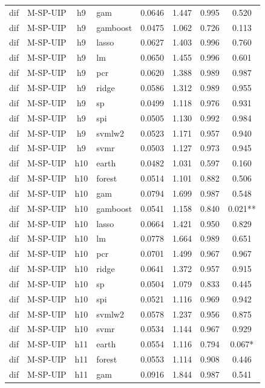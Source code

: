 \begin{ThreePartTable}
\begin{longtable}[t]{llclcccc}
dif & M-SP-UIP & h9 & gam & 0.0646 & 1.447 & 0.995 & 0.520\\
dif & M-SP-UIP & h9 & gamboost & 0.0475 & 1.062 & 0.726 & 0.113\\
dif & M-SP-UIP & h9 & lasso & 0.0627 & 1.403 & 0.996 & 0.760\\
dif & M-SP-UIP & h9 & lm & 0.0650 & 1.455 & 0.996 & 0.601\\
dif & M-SP-UIP & h9 & pcr & 0.0620 & 1.388 & 0.989 & 0.987\\
dif & M-SP-UIP & h9 & ridge & 0.0586 & 1.312 & 0.989 & 0.955\\
dif & M-SP-UIP & h9 & sp & 0.0499 & 1.118 & 0.976 & 0.931\\
dif & M-SP-UIP & h9 & spi & 0.0505 & 1.130 & 0.992 & 0.984\\
dif & M-SP-UIP & h9 & svmlw2 & 0.0523 & 1.171 & 0.957 & 0.940\\
dif & M-SP-UIP & h9 & svmr & 0.0503 & 1.127 & 0.973 & 0.945\\
\addlinespace
dif & M-SP-UIP & h10 & earth & 0.0482 & 1.031 & 0.597 & 0.160\\
dif & M-SP-UIP & h10 & forest & 0.0514 & 1.101 & 0.882 & 0.506\\
dif & M-SP-UIP & h10 & gam & 0.0794 & 1.699 & 0.987 & 0.548\\
dif & M-SP-UIP & h10 & gamboost & 0.0541 & 1.158 & 0.840 & 0.021**\\
dif & M-SP-UIP & h10 & lasso & 0.0664 & 1.421 & 0.950 & 0.829\\
dif & M-SP-UIP & h10 & lm & 0.0778 & 1.664 & 0.989 & 0.651\\
dif & M-SP-UIP & h10 & pcr & 0.0701 & 1.499 & 0.967 & 0.967\\
dif & M-SP-UIP & h10 & ridge & 0.0641 & 1.372 & 0.957 & 0.915\\
dif & M-SP-UIP & h10 & sp & 0.0504 & 1.079 & 0.833 & 0.445\\
dif & M-SP-UIP & h10 & spi & 0.0521 & 1.116 & 0.969 & 0.942\\
dif & M-SP-UIP & h10 & svmlw2 & 0.0578 & 1.237 & 0.956 & 0.875\\
dif & M-SP-UIP & h10 & svmr & 0.0534 & 1.144 & 0.967 & 0.929\\
\addlinespace
dif & M-SP-UIP & h11 & earth & 0.0554 & 1.116 & 0.794 & 0.067*\\
dif & M-SP-UIP & h11 & forest & 0.0553 & 1.114 & 0.908 & 0.446\\
dif & M-SP-UIP & h11 & gam & 0.0916 & 1.844 & 0.987 & 0.541\\

\end{longtable}
\end{ThreePartTable}
